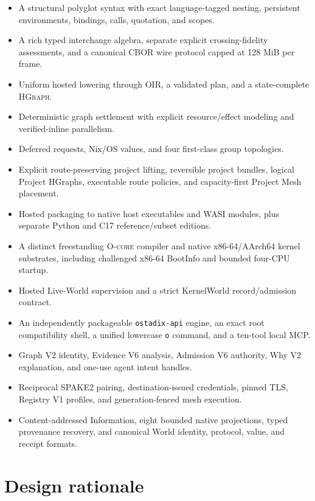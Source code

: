 \documentclass[11pt,oneside]{article}
\newcommand{\oir}{\textsc{OIR}}
\newcommand{\hgraph}{\textsc{HGraph}}
\newcommand{\ocore}{\textsc{O-core}}
\begin{document}
\begin{itemize}
  \item A structural polyglot syntax with exact language-tagged nesting,
        persistent environments, bindings, calls, quotation, and scopes.
  \item A rich typed interchange algebra, separate explicit crossing-fidelity
        assessments, and a canonical CBOR wire protocol capped at 128 MiB per
        frame.
  \item Uniform hosted lowering through \oir{}, a validated plan, and a
        state-complete \hgraph{}.
  \item Deterministic graph settlement with explicit resource/effect
        modeling and verified-inline parallelism.
  \item Deferred requests, Nix/OS values, and four first-class group
        topologies.
  \item Explicit route-preserving project lifting, reversible project bundles,
        logical Project HGraphs, executable route policies, and capacity-first
        Project Mesh placement.
  \item Hosted packaging to native host executables and WASI modules, plus
        separate Python and C17 reference/subset editions.
  \item A distinct freestanding \ocore{} compiler and native x86-64/AArch64
        kernel substrates, including challenged x86-64 BootInfo and bounded
        four-CPU startup.
  \item Hosted Live-World supervision and a strict KernelWorld record/admission
        contract.
  \item An independently packageable \texttt{ostadix-api} engine, an exact
        root compatibility shell, a unified lowercase \texttt{o} command, and
        a ten-tool local MCP.
  \item Graph V2 identity, Evidence V6 analysis, Admission V6 authority, Why V2
        explanation, and one-use agent intent handles.
  \item Reciprocal SPAKE2 pairing, destination-issued credentials, pinned TLS,
        Registry V1 profiles, and generation-fenced mesh execution.
  \item Content-addressed Information, eight bounded native projections,
        typed provenance recovery, and canonical World identity, protocol,
        value, and receipt formats.
\end{itemize}

\section{Design rationale}
\label{sec:assessment}
\end{document}
